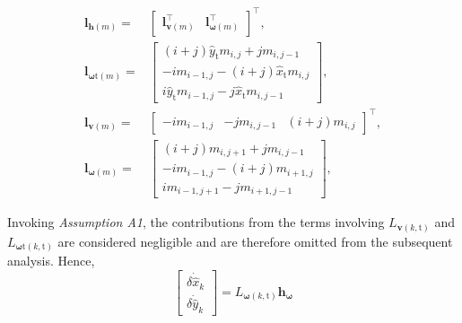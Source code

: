 \documentclass[lettersize,journal]{IEEEtran}
\begin{document}
\begin{align*}
    \boldsymbol{l}_{\boldsymbol{h}(m)} =& \begin{bmatrix} \boldsymbol{l}_{\boldsymbol{v}(m)}^{\top} & \boldsymbol{l}_{\boldsymbol{\omega}(m)}^{\top} \end{bmatrix}^{\top}, \\
    \boldsymbol{l}_{\boldsymbol{\omega}\text{t}(m)} =& \begin{bmatrix} (i+j) \hat{y}_{\text{t}} m_{i,j} + j m_{i,j-1} \\ - i m_{i-1,j} - (i + j) \hat{x}_{\text{t}} m_{i,j} \\ i \hat{y}_{\text{t}} m_{i-1,j} - j \hat{x}_{\text{t}} m_{i,j-1} \end{bmatrix}, \\
    \boldsymbol{l}_{\boldsymbol{v}(m)} =& \begin{bmatrix} - i m_{i-1,j} & - j m_{i,j-1} & (i + j) m_{i,j} \end{bmatrix}^{\top},\\
    \boldsymbol{l}_{\boldsymbol{\omega}(m)} =& \begin{bmatrix} (i+j) m_{i,j+1} + j m_{i,j-1} \\ - i m_{i-1,j} - (i + j) m_{i+1,j} \\ i m_{i-1,j+1} - j m_{i+1,j-1} \end{bmatrix},
\end{align*}

Invoking \textit{Assumption A1}, the contributions from the terms involving $L_{\boldsymbol{v}(k,\text{t})}$ and $L_{\boldsymbol{\omega}\text{t}(k,\text{t})}$ are considered negligible and are therefore omitted from the subsequent analysis.
Hence, 
\begin{equation} \label{Eq. (A12)}
    \begin{bmatrix} \delta \dot{\hat{x}}_{k} \\ \delta \dot{\hat{y}}_{k} \end{bmatrix} = L_{\boldsymbol{\omega}(k,\text{t})} \boldsymbol{h}_{\boldsymbol{\omega}}
\end{equation}
\end{document}
